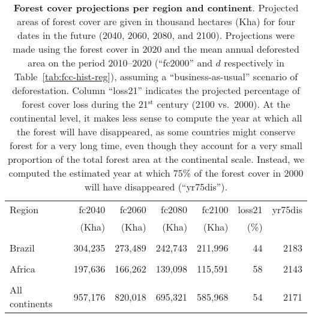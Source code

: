 \documentclass[
  12pt,
]{article}
\begin{document}
\begin{table}[H]

\caption{\label{tab:fcc-proj-reg}\textbf{Forest cover projections per region and continent}. Projected areas of forest cover are given in thousand hectares (Kha) for four dates in the future (2040, 2060, 2080, and 2100). Projections were made using the forest cover in 2020 and the mean annual deforested area on the period 2010--2020 (``fc2000'' and \(d\) respectively in Table~\ref{tab:fcc-hist-reg}), assuming a ``business-as-usual'' scenario of deforestation. Column ``loss21'' indicates the projected percentage of forest cover loss during the 21\(^\text{st}\) century (2100 vs.~2000). At the continental level, it makes less sense to compute the year at which all the forest will have disappeared, as some countries might conserve forest for a very long time, even though they account for a very small proportion of the total forest area at the continental scale. Instead, we computed the estimated year at which 75\% of the forest cover in 2000 will have disappeared (``yr75dis'').\vspace{0.5cm}}
\centering
\fontsize{11}{13}\selectfont
\begin{tabular}[t]{lrrrrrr}
\toprule
\multicolumn{1}{l}{Region} & \multicolumn{1}{r}{fc2040} & \multicolumn{1}{r}{fc2060} & \multicolumn{1}{r}{fc2080} & \multicolumn{1}{r}{fc2100} & \multicolumn{1}{r}{loss21} & \multicolumn{1}{r}{yr75dis} \\
 & (Kha) & (Kha) & (Kha) & (Kha) & (\%) & \\
\midrule
\cellcolor{gray!6}{India} & \cellcolor{gray!6}{5,878} & \cellcolor{gray!6}{3,445} & \cellcolor{gray!6}{2,069} & \cellcolor{gray!6}{722} & \cellcolor{gray!6}{93} & \cellcolor{gray!6}{2049}\\
Brazil & 304,235 & 273,489 & 242,743 & 211,996 & 44 & 2183\\
\cellcolor{gray!6}{America} & \cellcolor{gray!6}{563,305} & \cellcolor{gray!6}{506,564} & \cellcolor{gray!6}{454,291} & \cellcolor{gray!6}{404,344} & \cellcolor{gray!6}{41} & \cellcolor{gray!6}{2197}\\
Africa & 197,636 & 166,262 & 139,098 & 115,591 & 58 & 2143\\
\cellcolor{gray!6}{Asia} & \cellcolor{gray!6}{196,235} & \cellcolor{gray!6}{147,191} & \cellcolor{gray!6}{101,932} & \cellcolor{gray!6}{66,034} & \cellcolor{gray!6}{78} & \cellcolor{gray!6}{2094}\\
All continents & 957,176 & 820,018 & 695,321 & 585,968 & 54 & 2171\\
\bottomrule
\end{tabular}
\end{table}
\end{document}
